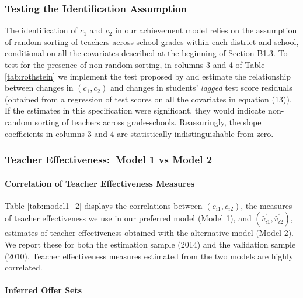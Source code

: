 \documentclass[notitlepage,12pt]{article}%
\begin{document}
\subsubsection{Testing the Identification Assumption}
\label{sorting}

The identification of $c_{1}$ and $c_{2}$ in our achievement model relies on
the assumption of random sorting of teachers across school-grades within each
district and school, conditional on all the covariates described at the beginning of Section 
B1.3. To test for the presence of non-random sorting, in columns 3 and 4 of Table \ref{tab:rothstein} we implement  the test proposed by \citet{rothstein2010teacher} and estimate the
relationship between changes in $(c_{1},c_{2})$ and changes in students' \emph{lagged}
test score residuals (obtained from a regression of test
scores on all the covariates in equation (13)). If the estimates in this specification were significant,
they would indicate non-random sorting of teachers across grade-schools.
Reassuringly, the slope coefficients in columns 3 and 4 are statistically indistinguishable from zero.




\subsubsection{Teacher Effectiveness:\ Model 1 vs Model 2}

\label{sec:model12}

\paragraph{Correlation of Teacher Effectiveness Measures}

Table \ref{tab:model1_2} displays the correlations between $\left(
c_{i1},c_{i2}\right)  $, the measures of teacher effectiveness we use in our
preferred model (Model 1), and $\left(  \hat{v}_{i1}^{\prime},\hat{v}%
_{i2}^{\prime}\right)  $, estimates of teacher effectiveness obtained with the
alternative model (Model 2). We report these for both the estimation sample
(2014) and the validation sample (2010). Teacher effectiveness measures
estimated from the two models are highly correlated.

\paragraph{Inferred Offer Sets}
\end{document}

